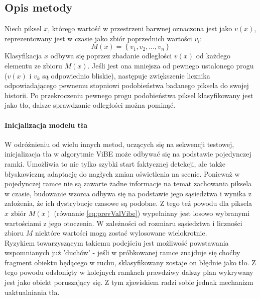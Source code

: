 \subsection{Opis metody}
Niech piksel $x$, którego wartość w przestrzeni barwnej oznaczona jest jako $v(x)$, reprezentowany jest w czasie jako zbiór poprzednich wartości $v_{i}$:
\begin{equation}
\label{eq:prevValVibe}
M(x) = \left\{v_{1}, v_{2}, ..., v_{n}\right\}
\end{equation}
Klasyfikacja $x$ odbywa się poprzez zbadanie odległości $v(x)$ od każdego elementu ze zbioru $M(x)$. Jeśli jest ona mniejsza od pewnego ustalonego progu ($v(x)$ i $v_{k}$ są odpowiednio bliskie), następuje zwiększenie licznika odpowiadającego pewnemu stopniowi podobieństwa badanego piksela do swojej historii. Po przekroczeniu pewnego progu podobieństwa piksel klasyfikowany jest jako tło, dalsze sprawdzanie odległości można pominąć.
\paragraph{Inicjalizacja modelu tła \\}
W odróżnieniu od wielu innych metod, uczących się na sekwencji testowej, inicjalizacja tła w algorytmie ViBE może odbywać się na podstawie pojedynczej ramki. Umożliwia to nie tylko szybki start faktycznej detekcji, ale także błyskawiczną adaptację do nagłych zmian oświetlenia na scenie. Ponieważ w pojedynczej ramce nie są zawarte żadne informacje na temat zachowania piksela w czasie, budowanie wzorca odbywa się na podstawie jego sąsiedztwa i wynika z założenia, że ich dystrybucje czasowe są podobne. Z tego też powodu dla piksela $x$ zbiór $M(x)$ (równanie \ref{eq:prevValVibe}) wypełniany jest losowo wybranymi wartościami z jego otoczenia. W zależności od rozmiaru sąsiedztwa i liczności zbioru $M$ niektóre wartości mogą zostać wylosowane wielokrotnie.\\
Ryzykiem towarzyszącym takiemu podejściu jest możliwość powstawania wspomnianych już 'duchów' - jeśli w próbkowanej ramce znajduje się choćby fragment obiektu będącego w ruchu, sklasyfikowany zostaje on błędnie jako tło. Z tego powodu odsłonięty w kolejnych ramkach prawdziwy dalszy plan wykrywany jest jako obiekt poruszający się. Z tym zjawiskiem radzi sobie jednak mechanizm uaktualniania tła.
